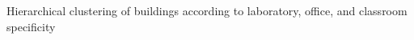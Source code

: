 Hierarchical clustering of buildings according to laboratory, office, and classroom specificity
\label{fig:specificity_high}